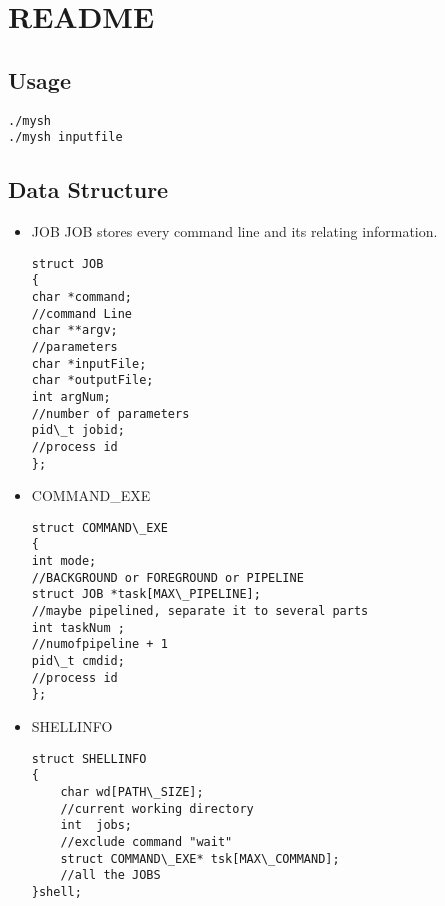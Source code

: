 \documentclass{article}
\begin{document}
\section{README}
	\subsection{Usage}
		\begin{lstlisting}
./mysh
./mysh inputfile 
		\end{lstlisting}
	\subsection{Data Structure}
		\begin{itemize}
			\item JOB
			JOB stores every command line and its relating information.
					\begin{lstlisting}
struct JOB
{
char *command;		
//command Line
char **argv;		
//parameters
char *inputFile;	
char *outputFile;
int argNum;			
//number of parameters
pid\_t jobid;		
//process id
};
					\end{lstlisting}
			\item COMMAND\_EXE
					\begin{lstlisting}
struct COMMAND\_EXE
{
int mode;                   	
//BACKGROUND or FOREGROUND or PIPELINE
struct JOB *task[MAX\_PIPELINE];	
//maybe pipelined, separate it to several parts 
int taskNum ;					
//numofpipeline + 1
pid\_t cmdid;					
//process id
};
					\end{lstlisting}
			\item SHELLINFO
				\begin{lstlisting}
struct SHELLINFO
{
	char wd[PATH\_SIZE];					 
	//current working directory
	int  jobs;                  		 
	//exclude command "wait"
	struct COMMAND\_EXE* tsk[MAX\_COMMAND];
	//all the JOBS
}shell;
				\end{lstlisting}
			\end{itemize}
\end{document}
